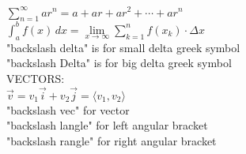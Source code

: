 \documentclass[11pt]{article}
\begin{document}
$\displaystyle{     \sum \limits_{n=1}^{\infty}  ar^n=a+ar+ar^2+  \cdots   +ar^n   }$\\



$\displaystyle{   \int_a^b f(x) \,dx=\lim \limits_{x \to \infty} \sum \limits_{k=1}^{n} f(x_k) \cdot \Delta x  }$\\
"backslash delta" is for small delta greek symbol\\
"backslash Delta" is for big delta greek symbol\\


VECTORS:\\


$\vec{v}=v_1 \vec{i}+v_2 \vec{j}=\langle v_1,v_2 \rangle$\\
"backslash vec" for vector\\
"backslash langle" for left angular bracket\\
"backslash rangle" for right angular bracket\\
\end{document}
